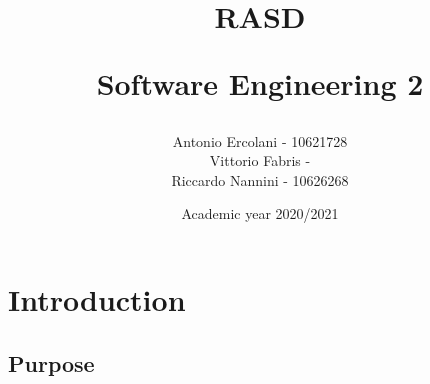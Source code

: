 \documentclass[]{article}
\title{ RASD \\
	\begin{large} 
		Software Engineering 2
	\end{large}}
\author{Antonio Ercolani - 10621728\\Vittorio Fabris - \\Riccardo Nannini - 10626268}
\date{Academic year 2020/2021}
\begin{document}
	
	\maketitle
	
	\begin{paragraph}
		\newline
	\end{paragraph}

	\newpage
	
	\tableofcontents
	
	\newpage
	
	
	\section{Introduction}
	
	\subsection{Purpose}
	
	 
\end{document}
